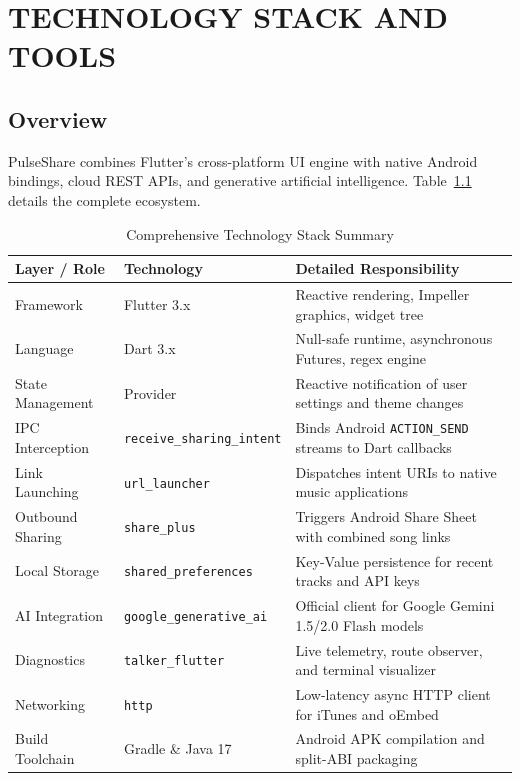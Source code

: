 \documentclass[12pt,a4paper]{report}
\begin{document}
\chapter{TECHNOLOGY STACK AND TOOLS}

\section{Overview}
PulseShare combines Flutter's cross-platform UI engine with native Android bindings, cloud REST APIs, and generative artificial intelligence. Table~\ref{tab:tech_stack} details the complete ecosystem.

\begin{table}[H]
\centering
\caption{Comprehensive Technology Stack Summary}
\label{tab:tech_stack}
\begin{tabularx}{\textwidth}{llX}
\toprule
\textbf{Layer / Role} & \textbf{Technology} & \textbf{Detailed Responsibility} \\
\midrule
Framework & Flutter 3.x & Reactive rendering, Impeller graphics, widget tree \\
Language & Dart 3.x & Null-safe runtime, asynchronous Futures, regex engine \\
State Management & Provider & Reactive notification of user settings and theme changes \\
IPC Interception & \texttt{receive\_sharing\_intent} & Binds Android \texttt{ACTION\_SEND} streams to Dart callbacks \\
Link Launching & \texttt{url\_launcher} & Dispatches intent URIs to native music applications \\
Outbound Sharing & \texttt{share\_plus} & Triggers Android Share Sheet with combined song links \\
Local Storage & \texttt{shared\_preferences} & Key-Value persistence for recent tracks and API keys \\
AI Integration & \texttt{google\_generative\_ai} & Official client for Google Gemini 1.5/2.0 Flash models \\
Diagnostics & \texttt{talker\_flutter} & Live telemetry, route observer, and terminal visualizer \\
Networking & \texttt{http} & Low-latency async HTTP client for iTunes and oEmbed \\
Build Toolchain & Gradle \& Java 17 & Android APK compilation and split-ABI packaging \\
\bottomrule
\end{tabularx}
\end{table}
\end{document}
